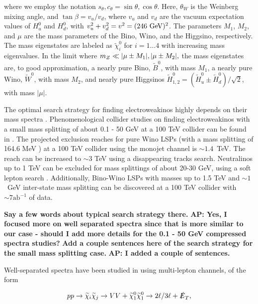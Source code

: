 \documentclass[a4paper,11pt]{article}
\newcommand{\Shufang}[1]{{\bf\color{Maroon}  #1}}
\newcommand{\Adarsh}[1]{{\bf\color{RoyalBlue} AP: #1}}
\renewcommand{\H}{\widetilde{H}^0}
\newcommand{\W}{\widetilde{W}^0}
\newcommand{\B}{\widetilde{B}^0}
\newcommand{\N}{\widetilde{\chi}^0}
\newcommand{\met}{{\slashed{E}_T}}
\begin{document}
\noindent where we employ the notation $s_\theta, c_\theta = \sin\theta, \cos\theta$. Here,  $\theta_W$ is the Weinberg mixing angle, 
and $\tan\beta= v_u/v_d$, where $v_u$ and $v_d$ are the vacuum
expectation values of $H_u^0$ and $H_d^0$, with $v_u^2+v_d^2=v^2=(246\ {\rm
GeV})^2$. The parameters $M_1$, $M_2$, and $\mu$ are the mass parameters of
the Bino, Wino, and the Higgsino, respectively.
The mass eigenstates are labeled as $\N_i$ for $i=1 \ldots 4$ with increasing mass eigenvalues.
In the limit where $m_Z \ll |\mu\pm M_1|, |\mu\pm M_2|,$ the mass eigenstates
are, to good approximation, a nearly pure Bino, $\B$, with mass $M_1$,
a nearly pure Wino, $\W$, with mass $M_2$, and nearly pure Higgsinos
$\H_{1,2} = (\H_u \pm \H_d)/\sqrt{2}$, with mass
$|\mu|$. 

The optimal search strategy for finding electroweakinos   highly depends on
their mass spectra \cite{Han:2013kza}.  Phenomenological collider studies on
finding electroweakinos with a small mass splitting of about 0.1 - 50 GeV at a
100 TeV collider can be found in \cite{Low:2014cba, Bramante:2014tba,
Berlin:2015aba, Cirelli:2014dsa}. The projected exclusion reaches for pure Wino
LSPs (with a mass splitting of 164.6 MeV \cite{Ibe:2012sx}) at a 100 TeV
collider using the monojet channel is $\sim1.4$~TeV.  The reach
can be increased to $\sim3$ TeV using a disappearing tracks search.
Neutralinos up to 1 TeV can be excluded for mass splittings of about 20-30 GeV,
using a soft lepton search \cite{Low:2014cba}. Additionally, Bino-Wino LSPs
with masses up to 1.5 TeV and $\sim 1$~GeV inter-state mass splitting can be
discovered at a 100 TeV collider with $\sim7 \text{ab}^{-1}$ of data. 
  
  \Shufang{Say a few words about typical
  search strategy there.} \Adarsh{Yes, I focused more on well separated spectra
  since that is more similar to our case - should I add more details for the
  0.1 - 50 GeV compressed spectra studies?} \Shufang{Add a couple sentences
  here of the search strategy for the small mass splitting case.}
  \Adarsh{I added a couple of sentences.}

  Well-separated spectra have been studied in \cite{Gori:2014oua,
  Acharya:2014pua} using multi-lepton channels, of the form 

\begin{align}
  pp\rightarrow \widetilde{\chi}_i\widetilde{\chi}_j\rightarrow VV +
  \N_1\N_1\rightarrow 2\ell/3\ell + \met,
\end{align}
\end{document}
